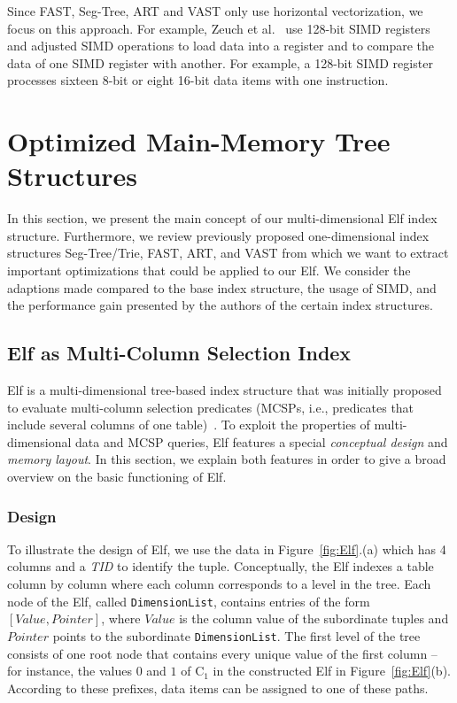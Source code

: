 \documentclass[runningheads,a4paper]{llncs}
\begin{document}
Since FAST, Seg-Tree, ART and VAST only use horizontal vectorization, we focus on this approach.  For example, Zeuch et al.\ \cite{zeuch2014adapting} use 128-bit SIMD registers and adjusted SIMD operations to load data into a register and to compare the data of one SIMD register with another. For example, a 128-bit SIMD register processes sixteen 8-bit or eight 16-bit data items with one instruction. %


\section{Optimized Main-Memory Tree Structures}
In this section, we present the main concept of our multi-dimensional Elf index structure. Furthermore, we review previously proposed one-dimensional index structures Seg-Tree/Trie, FAST, ART, and VAST from which we want to extract important optimizations that could be applied to our Elf. We consider the adaptions made compared to the base index structure, the usage of SIMD, and the performance gain presented by the authors of the certain index structures.


\subsection{Elf as Multi-Column Selection Index}\label{elf}

Elf is a multi-dimensional tree-based index structure that was initially proposed to evaluate multi-column selection predicates (MCSPs, i.e., predicates that include several columns of one table)~\cite{BKS+17}. To exploit the properties of multi-dimensional data and MCSP queries, Elf features a special \textit{conceptual design} and \textit{memory layout}. In this section, we explain both features in order to give a broad overview on the basic functioning of Elf.



\subsubsection{Design}
To illustrate the design of Elf, we use the data in Figure~\ref{fig:Elf}.(a) which has 4 columns and a \textit{TID} to identify the tuple. 
Conceptually, the Elf indexes a table column by column where each column corresponds to a level in the tree. Each node of the Elf, called \verb.DimensionList., contains entries of the form $[Value, Pointer]$, where $Value$ is the column value of the subordinate tuples and $Pointer$ points to the subordinate \verb.DimensionList.. The first level of the tree consists of one root node that contains every unique value of the first column -- for instance, the values $0$ and $1$ of C$_{1}$ in the constructed Elf in Figure~\ref{fig:Elf}(b).  According to these prefixes, data items can be assigned to one of these paths. 
\end{document}
